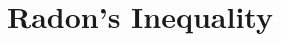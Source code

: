 \documentclass[inequalities.tex]{subfile}
\begin{document}
	\section{Radon's Inequality}\label{sec:radon}
\end{document}

